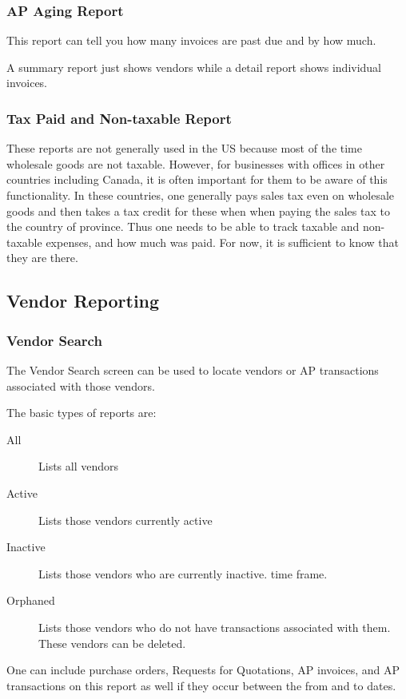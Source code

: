 \documentclass{article}
\begin{document}
\subsubsection{AP Aging Report}
This report can tell you how many invoices are past due and by how much.

A summary report just shows vendors while a detail report shows individual 
invoices.

\subsubsection{Tax Paid and Non-taxable Report}
These reports are not generally used in the US because most of the time 
wholesale goods are not taxable.  However, for businesses with offices in other
countries including Canada, it is often important for them to be aware of this
functionality.  In these countries, one generally pays sales tax even on
wholesale goods and then takes a tax credit for these when when paying the sales
tax to the country of province.  Thus one needs to be able to track taxable and
non-taxable expenses, and how much was paid.  For now, it is sufficient to know
that they are there.

\subsection{Vendor Reporting}
\subsubsection{Vendor Search}
The Vendor Search screen can be used to locate vendors or AP transactions
associated with those vendors.

The basic types of reports are:

\begin{description}
\item[All] Lists all vendors
\item[Active] Lists those vendors currently active
\item[Inactive] Lists those vendors who are currently inactive.
time frame.
\item[Orphaned] Lists those vendors who do not have transactions associated with
them.  These vendors can be deleted. 
\end{description}

One can include purchase orders, Requests for Quotations, AP invoices, and AP
transactions on this report as well if they occur between the from and to dates.
\end{document}
